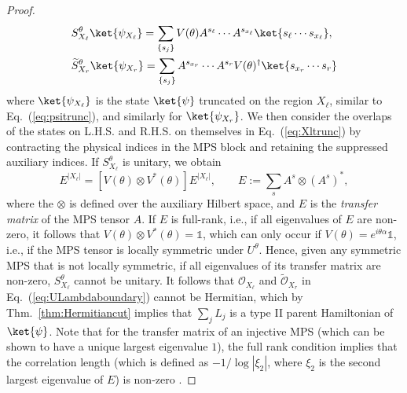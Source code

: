 \documentclass[prx,letterpaper,aps,superscriptaddress,floatfix,twocolumn,nofootinbib]{revtex4-2}
\theoremstyle{definition}
\newcommand{\defn}{:=}
\begin{document}
\begin{proof}
\begin{align}
    &S^\theta_{X_\ell}\ket{\psi_{X_{\ell}}} = \sum_{\{s_j\}}{V(\theta) A^{s_{\ell}} \cdots A^{s_{x_\ell}}}\ket{s_\ell \cdots s_{x_\ell}},\label{eq:Xltrunc}\\
    &\widetilde{S}^\theta_{X_r}\ket{\psi_{X_{r}}} = \sum_{\{s_j\}}{A^{s_{x_r}} \cdots A^{s_r}} V(\theta)^\dagger\ket{s_{x_r}  \cdots s_{r}}\label{eq:Xrtrunc}
\end{align}
where $\ket{\psi_{X_\ell}}$ is the state $\ket{\psi}$ truncated on the region $X_\ell$, similar to Eq.~(\ref{eq:psitrunc}), and similarly for $\ket{\psi_{X_r}}$.
%
We then consider the overlaps of the states on L.H.S. and R.H.S. on themselves in Eq.~(\ref{eq:Xltrunc}) by contracting the physical indices in the MPS block and retaining the suppressed auxiliary indices.
%
If $S^\theta_{X_{\ell}}$ is unitary, we obtain
\begin{equation}
    E^{|X_\ell|} = [V(\theta) \otimes V^\ast(\theta)]E^{|X_\ell|},\qquad E \defn \sum_{s}{A^s \otimes (A^s)^\ast},
\label{eq:transferMPS}
\end{equation}
where the $\otimes$ is defined over the auxiliary Hilbert space, and $E$ is the \textit{transfer matrix} of the MPS tensor $A$. 
%
If $E$ is full-rank, i.e., if all eigenvalues of $E$ are non-zero, it follows that $V(\theta) \otimes V^\ast(\theta) = \mathds{1}$, which can only occur if $V(\theta) = e^{i\theta\alpha}\mathds{1}$, i.e., if the MPS tensor is locally symmetric under $U^\theta$.
%
Hence, given any symmetric MPS that is not locally symmetric, if all eigenvalues of its transfer matrix are non-zero, $S^\theta_{X_\ell}$ cannot be unitary.
%
It follows that $\mathcal{O}_{X_\ell}$ and $\widetilde{\mathcal{O}}_{X_r}$ in Eq.~(\ref{eq:ULambdaboundary}) cannot be Hermitian, which by Thm.~\ref{thm:Hermitiancut} implies that $\sum_j{L_j}$ is a type II parent Hamiltonian of $\ket{\psi}$. 
%
Note that for the transfer matrix of an injective MPS (which can be shown to have a unique largest eigenvalue $1$), the full rank condition implies that the correlation length (which is defined as $-1/\log |\xi_2|$, where $\xi_2$ is the second largest eigenvalue of $E$) is non-zero .
%
\end{proof}
%
%
\end{document}
